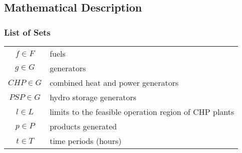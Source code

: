 \documentclass[preprint, 12pt, authoryear]{elsarticle}
\begin{document}
\subsection{Mathematical Description}
\subsubsection{List of Sets}
\begin{tabular}{c l}
$f \in F$ & fuels \\
$g \in G$ & generators \\
$CHP \in G$ & combined heat and power generators \\
$PSP \in G$ & hydro storage generators \\
$l \in L$ & limits to the feasible operation region of CHP plants \\
$p \in P$ & products generated \\
$t \in T$ & time periods (hours)
\end{tabular}
\end{document}
